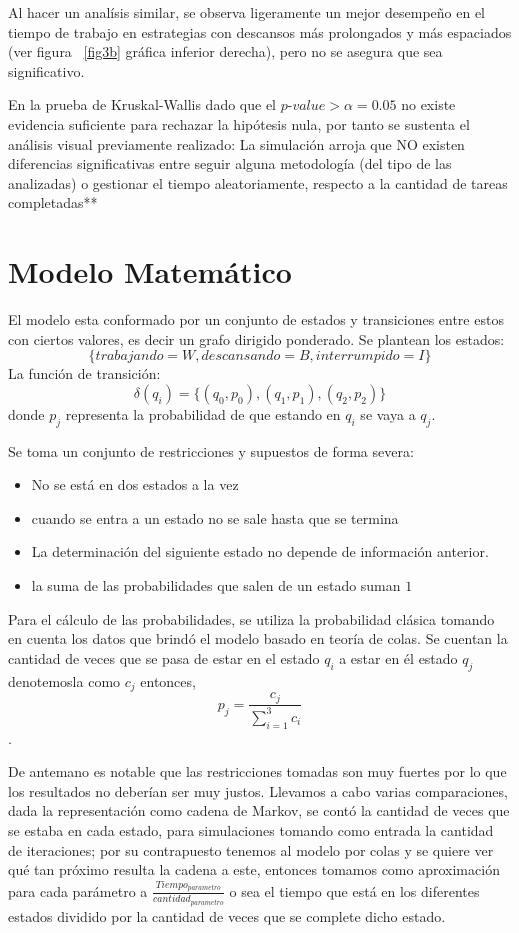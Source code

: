 \documentclass[10pt,a4paper,twocolumn]{article}
\begin{document}
Al hacer un analísis similar, se observa ligeramente un mejor desempeño en el tiempo de trabajo en estrategias con descansos más prolongados y más espaciados (ver figura ~\ref{fig3b} gráfica inferior derecha), pero no se asegura que sea significativo.


En la prueba de Kruskal-Wallis dado que el $p$-$value > \alpha = 0.05$ no existe evidencia suficiente para rechazar la hipótesis nula, por tanto se sustenta el análisis visual previamente realizado: La simulación arroja que NO existen diferencias significativas entre seguir alguna metodología (del tipo de las analizadas) o gestionar el tiempo aleatoriamente, respecto a la cantidad de tareas completadas**

\section{Modelo Matem\'atico}

El modelo esta conformado por un conjunto de estados y transiciones entre estos con ciertos valores, es decir un grafo dirigido ponderado. Se plantean los estados:  $$\{trabajando = W, descansando = B, interrumpido = I\}$$ La funci\'on de transici\'on: $$\delta(q_i) = \{(q_0, p_0), (q_1, p_1), (q_2, p_2)\}$$ donde $p_j$ representa la probabilidad de que estando en $q_i$ se vaya a $q_j$.

Se toma un conjunto de restricciones y supuestos de forma severa:
\begin{itemize}
    \item No se est\'a en dos estados a la vez
    \item cuando se entra a un estado no se sale hasta que se termina
    \item La determinación del siguiente estado no depende de información anterior.
    \item la suma de las probabilidades que salen de un estado suman $1$
\end{itemize} 

Para el c\'alculo de las probabilidades, se utiliza la probabilidad cl\'asica tomando en cuenta los datos que brind\'o el modelo basado en teor\'ia de colas. Se cuentan la cantidad de veces que se pasa de estar en el estado $q_i$ a estar en \'el estado $q_j$ denotemosla como $c_j$ entonces, $$p_j = \frac{c_j}{\sum_{i=1}^{3} c_i}$$.

De antemano es notable que las restricciones tomadas son muy fuertes por lo que los resultados no deber\'ian ser muy justos. Llevamos a cabo varias comparaciones, dada la representaci\'on como cadena de Markov, se cont\'o la cantidad de veces que se estaba en cada estado, para simulaciones tomando como entrada la cantidad de iteraciones; por su contrapuesto tenemos al modelo por colas y se quiere ver qu\'e tan pr\'oximo resulta la cadena a este, entonces tomamos como aproximaci\'on para cada par\'ametro a $\frac{Tiempo_{parametro}}{cantidad_{parametro}}$ o sea el tiempo que est\'a en los diferentes estados dividido por la cantidad de veces que se complete dicho estado.
\end{document}
